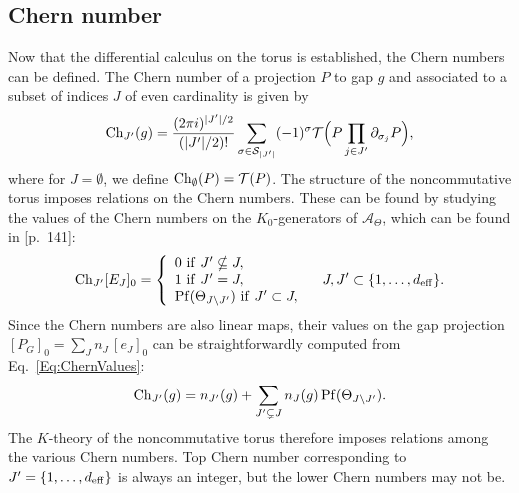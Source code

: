 \documentclass[
    aps,
    prb,
    twocolumn,
    floatfix,
    superscriptaddress,
	10pt
]{revtex4-2}
\begin{document}
\subsection{Chern number}

Now that the differential calculus on the torus is established, the Chern numbers can be defined.
The Chern number of a projection $P$ to gap $g$ and associated to a subset of indices $J$ of even cardinality is given by
\begin{equation}
	    {\rm Ch}_{J'}(g) = \frac{(2\pi i)^{|J'|/2}}{( |J'|/2 )!} \sum_{\sigma \in {\mathcal S}_{|J'|}} (-1)^\sigma {\mathcal T}\Big ( P \prod_{j \in J'} \partial_{\sigma_j}P \Big ) ,
\end{equation}
where for $J = \emptyset$, we define ${\rm Ch}_\emptyset(P) = {\mathcal T}(P)$.
The structure of the noncommutative torus imposes relations on the Chern numbers.
These can be found by studying the values of the Chern numbers on the $K_0$-generators of $\mathcal{A}_\Theta$, which can be found in \cite{Prodan2016}[p.~141]:
\begin{equation}\label{Eq:ChernValues}
{\rm Ch}_{J'} [E_J]_0 = \left \{ 
\begin{array}{l}
0 \ {\rm if} \ J'\nsubseteq J  , \\
1 \ {\rm if} \ J' = J , \\
{\rm Pf}(\Theta_{J\setminus J'}) \ {\rm if} \ J' \subset J,
\end{array}
\right .  \quad J, J' \subset \{1,\ldots,{d_\mathrm{eff}}\}.
\end{equation}
Since the Chern numbers are also linear maps, their values on the gap projection $[P_G]_0 = \sum_{J} n_J \, [e_J]_0$ can be straightforwardly computed from Eq.~\eqref{Eq:ChernValues}:
\begin{equation}\label{Eq:ChernVal}
{\rm Ch}_{J'}(g) = n_{J'}(g) + \sum_{J' \subsetneq J} n_J(g) \, {\rm Pf}(\Theta_{J\setminus J'}).
\end{equation} 
The $K$-theory of the noncommutative torus therefore imposes relations among the various Chern numbers. 
Top Chern number corresponding to $J'=\{1,\ldots,{d_\mathrm{eff}}\}$ is always an integer, but the lower Chern numbers may not be.
\end{document}
